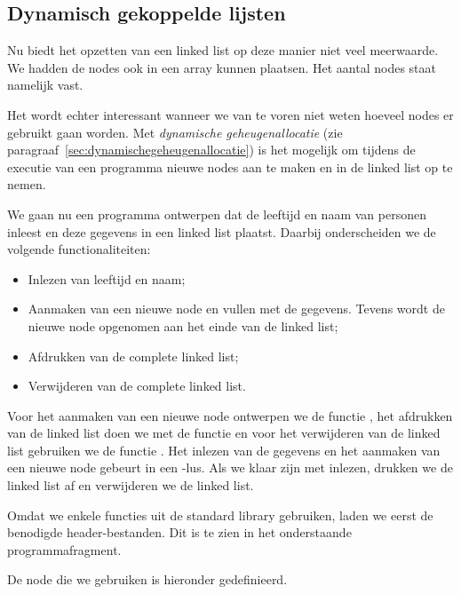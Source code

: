 

\subsection{Dynamisch gekoppelde lijsten}
Nu biedt het opzetten van een linked list op deze manier niet veel meerwaarde. We hadden de nodes ook in een array kunnen plaatsen. Het aantal nodes staat namelijk vast.

Het wordt echter interessant wanneer we van te voren niet weten hoeveel nodes er gebruikt gaan worden. Met \textsl{dynamische geheugenallocatie} (zie paragraaf~\ref{sec:dynamischegeheugenallocatie}) is het mogelijk om tijdens de executie van een programma nieuwe nodes aan te maken en in de linked list op te nemen.

We gaan nu een programma ontwerpen dat de leeftijd en naam van personen inleest en deze gegevens in een linked list plaatst. Daarbij onderscheiden we de volgende functionaliteiten:

\begin{itemize}
\item Inlezen van leeftijd en naam;
\item Aanmaken van een nieuwe node en vullen met de gegevens. Tevens wordt de nieuwe node opgenomen aan het einde van de linked list;
\item Afdrukken van de complete linked list;
\item Verwijderen van de complete linked list.
\end{itemize}

Voor het aanmaken van een nieuwe node ontwerpen we de functie , het afdrukken van de linked list doen we met de functie  en voor het verwijderen van de linked list gebruiken we de functie . Het inlezen van de gegevens en het aanmaken van een nieuwe node gebeurt in een -lus. Als we klaar zijn met inlezen, drukken we de linked list af en verwijderen we de linked list.

Omdat we enkele functies uit de standard library gebruiken, laden we eerst de benodigde header-bestanden. Dit is te zien in het onderstaande programmafragment.


De node die we gebruiken is hieronder gedefinieerd.

